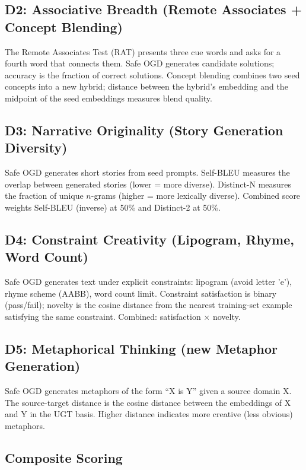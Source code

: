 \documentclass[11pt]{article}
\begin{document}
\subsection{D2: Associative Breadth (Remote Associates + Concept Blending)}

The Remote Associates Test (RAT) presents three cue words and asks for a fourth word that connects them. Safe OGD generates candidate solutions; accuracy is the fraction of correct solutions. Concept blending combines two seed concepts into a new hybrid; distance between the hybrid's embedding and the midpoint of the seed embeddings measures blend quality.

\subsection{D3: Narrative Originality (Story Generation Diversity)}

Safe OGD generates short stories from seed prompts. Self-BLEU measures the overlap between generated stories (lower = more diverse). Distinct-N measures the fraction of unique $n$-grams (higher = more lexically diverse). Combined score weights Self-BLEU (inverse) at 50\% and Distinct-2 at 50\%.

\subsection{D4: Constraint Creativity (Lipogram, Rhyme, Word Count)}

Safe OGD generates text under explicit constraints: lipogram (avoid letter 'e'), rhyme scheme (AABB), word count limit. Constraint satisfaction is binary (pass/fail); novelty is the cosine distance from the nearest training-set example satisfying the same constraint. Combined: satisfaction $\times$ novelty.

\subsection{D5: Metaphorical Thinking (new Metaphor Generation)}

Safe OGD generates metaphors of the form ``X is Y'' given a source domain X. The source-target distance is the cosine distance between the embeddings of X and Y in the UGT basis. Higher distance indicates more creative (less obvious) metaphors.

\subsection{Composite Scoring}
\end{document}
